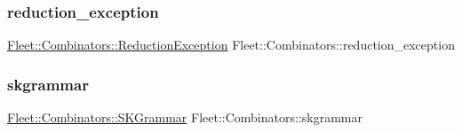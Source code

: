 \subsubsection{\texorpdfstring{reduction\+\_\+exception}{reduction\_exception}}
{\footnotesize\ttfamily  \hyperlink{class_fleet_1_1_combinators_1_1_reduction_exception}{Fleet\+::\+Combinators\+::\+Reduction\+Exception}  Fleet\+::\+Combinators\+::reduction\+\_\+exception}

\mbox{\label{namespace_fleet_1_1_combinators_a5293b7a2dcdbfb430b45fcf401e3bab0}} 
\subsubsection{\texorpdfstring{skgrammar}{skgrammar}}
{\footnotesize\ttfamily  \hyperlink{class_fleet_1_1_combinators_1_1_s_k_grammar}{Fleet\+::\+Combinators\+::\+S\+K\+Grammar}  Fleet\+::\+Combinators\+::skgrammar}

